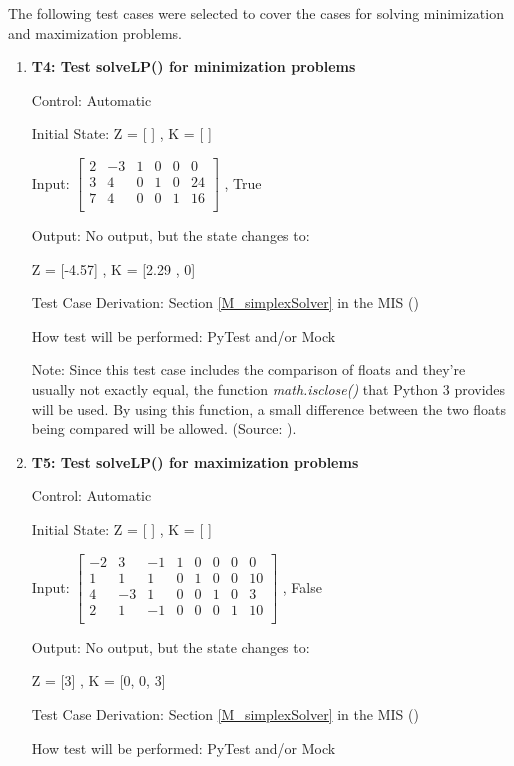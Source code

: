 \documentclass[12pt, titlepage]{article}
\begin{document}
The following test cases were selected to cover the cases for solving 
minimization and maximization problems.

\begin{enumerate}
	
	\item{\textbf{T4: Test solveLP() for minimization problems}}

	Control: Automatic
	
	Initial State: Z = [ ] , K = [ ]
	
	Input: 	$\begin{bmatrix}
	2 & -3 & 1 & 0 & 0 & 0\\
	3 & 4 & 0 & 1 & 0 & 24\\
	7 & 4 & 0 & 0 & 1 & 16\\
	\end{bmatrix}$ , True 
	
	Output: No output, but the state changes to:
	
	Z = [-4.57] , K = [2.29 , 0]
	
	Test Case Derivation: Section \ref{M_simplexSolver} in the MIS 
	(\cite{losms-mis})
	
	How test will be performed: PyTest and/or Mock
	
	Note: Since this test case includes the comparison of floats and they're 
	usually not exactly equal, the function \textit{math.isclose()} that Python 
	3 provides will be used. By using this function, a small difference between 
	the two floats being compared will be allowed. (Source: \cite{python3-doc}).
	
	\item{\textbf{T5: Test solveLP() for maximization problems}}
	
	Control: Automatic
	
	Initial State: Z = [ ] , K = [ ]
	
	Input: 	$\begin{bmatrix}
	-2 & 3 & -1 & 1 & 0 & 0 & 0 & 0\\
	1 & 1 & 1 & 0 & 1 & 0 & 0 & 10\\
	4 & -3 & 1 & 0 & 0 & 1 & 0 & 3\\
	2 & 1 & -1 & 0 & 0 & 0 & 1 & 10\\
	\end{bmatrix}$ , False 
	
	Output: No output, but the state changes to:
	
	Z = [3] , K = [0, 0, 3]
	
	Test Case Derivation: Section \ref{M_simplexSolver} in the MIS 
	(\cite{losms-mis})
	
	How test will be performed: PyTest and/or Mock
		
\end{enumerate}
\end{document}
